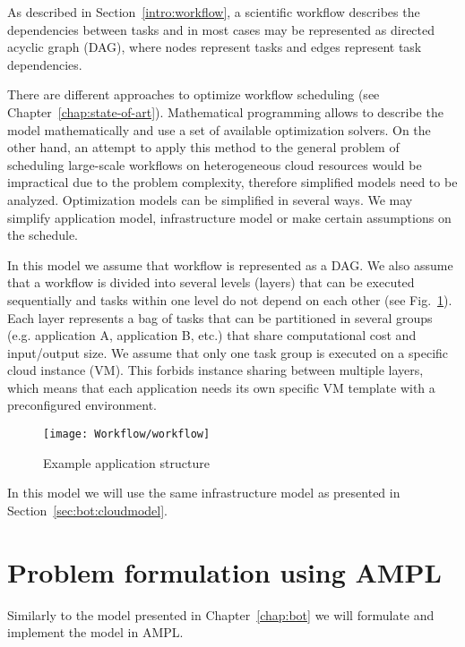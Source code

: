 {    As described in Section \ref{intro:workflow}, a scientific workflow describes the dependencies between tasks and in most cases may be represented as directed acyclic graph (DAG), where nodes represent tasks and edges represent task dependencies. 
    
    There are different approaches to optimize workflow scheduling (see Chapter \ref{chap:state-of-art}). Mathematical programming allows to describe the model mathematically and use a set of available optimization solvers. On the other hand, an attempt to apply this method to the general problem of scheduling large-scale workflows on heterogeneous cloud resources would be impractical due to the problem complexity, therefore simplified models need to be analyzed. Optimization models can be simplified in several ways. We may simplify application model, infrastructure model or make certain assumptions on the schedule.
    
    In this model we assume that workflow is represented as a DAG. We also assume that a workflow is divided into several levels (layers) that can be executed sequentially and tasks within one level do not depend on each other (see Fig.~\ref{fig:workflow:appmodel}). Each layer represents a bag of tasks that can be partitioned in several groups (e.g. application A, application B, etc.) that share computational cost and input/output size. We assume that only one task group is executed on a specific cloud instance (VM). This forbids instance sharing between multiple layers, which means that each application needs its own specific VM template with a preconfigured environment.

    \begin{figure}[tb]
        \centering \texttt{[image: Workflow/workflow]}
        \caption{Example application structure}
        \label{fig:workflow:appmodel}
    \end{figure}
    
    In this model we will use the same infrastructure model as presented in Section~\ref{sec:bot:cloudmodel}.
  
    \section{Problem formulation using AMPL}
    \label{sec:workflow:problem}
  
    Similarly to the model presented in Chapter~\ref{chap:bot} we will formulate and implement the model in AMPL.
    
}
